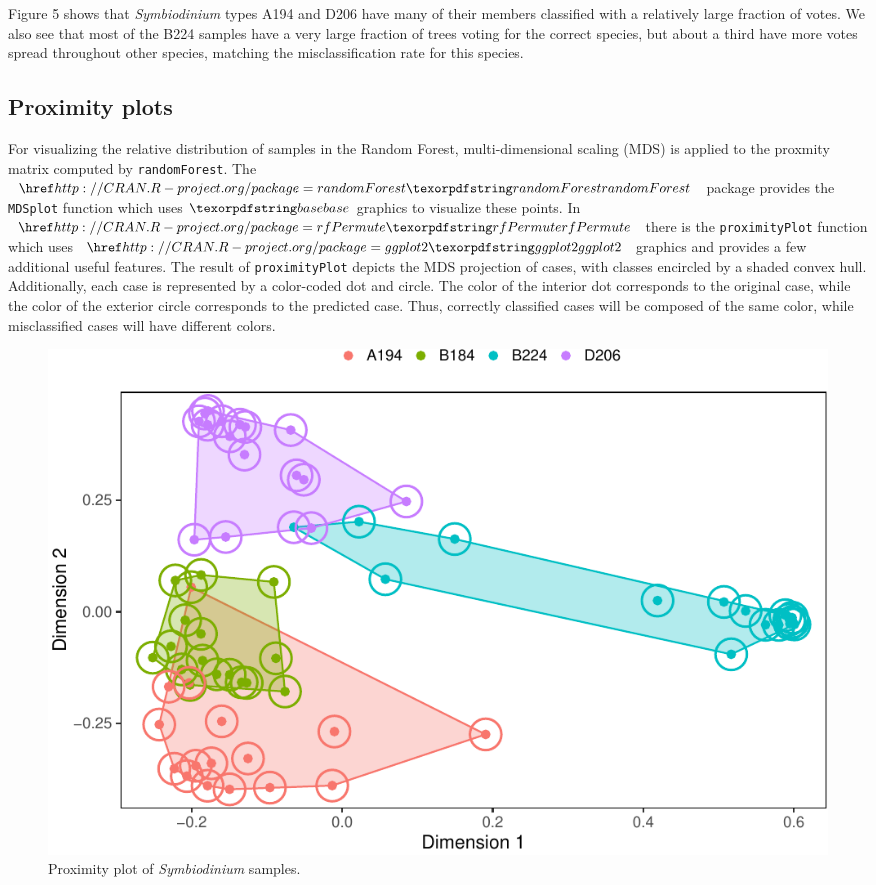 Figure 5 shows that \emph{Symbiodinium} types A194 and D206 have many of
their members classified with a relatively large fraction of votes. We
also see that most of the B224 samples have a very large fraction of
trees voting for the correct species, but about a third have more votes
spread throughout other species, matching the misclassification rate for
this species.

\subsection{Proximity plots}\label{proximity-plots}

For visualizing the relative distribution of samples in the Random
Forest, multi-dimensional scaling (MDS) is applied to the proxmity
matrix computed by \texttt{randomForest}. The \(\CRANpkg{randomForest}\)
package provides the \texttt{MDSplot} function which uses \(\pkg{base}\)
graphics to visualize these points. In \(\CRANpkg{rfPermute}\) there is
the \texttt{proximityPlot} function which uses \(\CRANpkg{ggplot2}\)
graphics \citep{Wickham2009} and provides a few additional useful
features. The result of \texttt{proximityPlot} depicts the MDS
projection of cases, with classes encircled by a shaded convex hull.
Additionally, each case is represented by a color-coded dot and circle.
The color of the interior dot corresponds to the original case, while
the color of the exterior circle corresponds to the predicted case.
Thus, correctly classified cases will be composed of the same color,
while misclassified cases will have different colors.

\begin{Schunk}
\begin{figure}
\includegraphics{archer_files/figure-latex/proximityPlot-1} \caption[Proximity plot of \textit{Symbiodinium} samples]{Proximity plot of \textit{Symbiodinium} samples.}\label{fig:proximityPlot}
\end{figure}
\end{Schunk}


